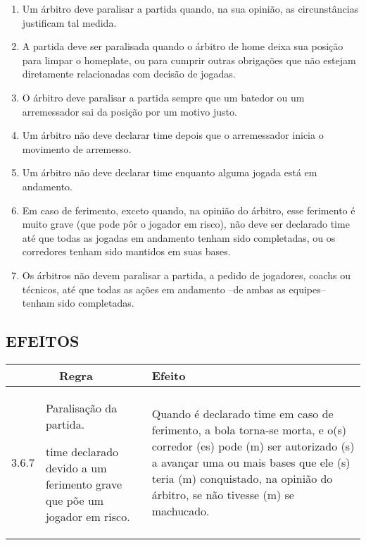 \begin{multicols}{2}
	\begin{enumerate}[label=\alph*)]
		\item Um \'arbitro deve paralisar a partida quando, na sua opini\~ao, as circunst\^ancias justificam tal medida. 
		
		\item  A partida deve ser paralisada quando o \'arbitro de \gls{home} deixa sua posi\c{c}\~ao para limpar o \gls{homeplate}, ou para cumprir outras obriga\c{c}\~oes que n\~ao estejam diretamente relacionadas com decis\~ao de jogadas.
		\item O \'arbitro deve paralisar a partida sempre que um batedor ou um arremessador sai da posi\c{c}\~ao por um motivo justo. 
		
		\item  Um \'arbitro n\~ao deve declarar \gls{time} depois que o arremessador inicia o movimento de arremesso. 
		
		\item  Um \'arbitro n\~ao deve declarar \gls{time} enquanto alguma jogada est\'a em andamento. 
		\item  Em caso de ferimento, exceto quando, na opini\~ao do \'arbitro, esse ferimento \'e muito grave (que pode pôr o jogador em risco), n\~ao deve ser declarado \gls{time} at\'e que todas as jogadas em andamento tenham sido completadas, ou os corredores tenham sido mantidos em suas bases. 
		
		\item  Os \'arbitros n\~ao devem paralisar a partida, a pedido de jogadores, \glspl{coach} ou 	t\'ecnicos, at\'e que todas as a\c{c}\~oes em andamento –de ambas as equipes– tenham sido 
		completadas. 
	\end{enumerate}
	
	\subsection*{EFEITOS}
\end{multicols}
{\footnotesize
	\begin{tabular}{p{}p{}|p{}}
		\multicolumn{2}{c|}{Regra} & Efeito \\\hline\hline 
		
		3.6.7 & Paralisa\c{c}\~ao da partida. 
		
		\gls{time} declarado devido a um ferimento grave que p\~oe um jogador em risco. 
		&
		
		
		Quando \'e declarado \gls{time} em caso de ferimento, a bola torna-se morta, e o(s) corredor (es) pode (m) ser autorizado (s) a avan\c{c}ar uma ou mais bases que ele (s) teria (m) conquistado, na opini\~ao do \'arbitro, se n\~ao tivesse (m) se machucado. 
\end{tabular}}

